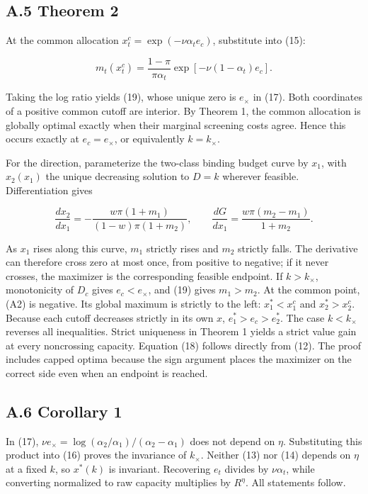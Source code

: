 \documentclass[
  11pt,
]{article}
\begin{document}
\subsection{A.5 Theorem 2}\label{a.5-theorem-2}

At the common allocation \(x_t^c=\exp(-\nu\alpha_t e_c)\), substitute
into (15):

\[m_t(x_t^c)=\frac{1-\pi}{\pi\alpha_t}
\exp[-\nu(1-\alpha_t)e_c].\]

Taking the log ratio yields (19), whose unique zero is \(e_\times\) in
(17). Both coordinates of a positive common cutoff are interior. By
Theorem 1, the common allocation is globally optimal exactly when their
marginal screening costs agree. Hence this occurs exactly at
\(e_c=e_\times\), or equivalently \(k=k_\times\).

For the direction, parameterize the two-class binding budget curve by
\(x_1\), with \(x_2(x_1)\) the unique decreasing solution to \(D=k\)
wherever feasible. Differentiation gives

\[\frac{dx_2}{dx_1}=-\frac{w\pi(1+m_1)}{(1-w)\pi(1+m_2)},\qquad
\frac{dG}{dx_1}=\frac{w\pi(m_2-m_1)}{1+m_2}. \tag{A2}\]

As \(x_1\) rises along this curve, \(m_1\) strictly rises and \(m_2\)
strictly falls. The derivative can therefore cross zero at most once,
from positive to negative; if it never crosses, the maximizer is the
corresponding feasible endpoint. If \(k>k_\times\), monotonicity of
\(D_c\) gives \(e_c<e_\times\), and (19) gives \(m_1>m_2\). At the
common point, (A2) is negative. Its global maximum is strictly to the
left: \(x_1^*<x_1^c\) and \(x_2^*>x_2^c\). Because each cutoff decreases
strictly in its own \(x\), \(e_1^*>e_c>e_2^*\). The case \(k<k_\times\)
reverses all inequalities. Strict uniqueness in Theorem 1 yields a
strict value gain at every noncrossing capacity. Equation (18) follows
directly from (12). The proof includes capped optima because the sign
argument places the maximizer on the correct side even when an endpoint
is reached.

\subsection{A.6 Corollary 1}\label{a.6-corollary-1}

In (17), \(\nu e_\times=\log(\alpha_2/\alpha_1)/(\alpha_2-\alpha_1)\)
does not depend on \(\eta\). Substituting this product into (16) proves
the invariance of \(k_\times\). Neither (13) nor (14) depends on
\(\eta\) at a fixed \(k\), so \(x^*(k)\) is invariant. Recovering
\(e_t\) divides by \(\nu\alpha_t\), while converting normalized to raw
capacity multiplies by \(R^\eta\). All statements follow.
\end{document}

